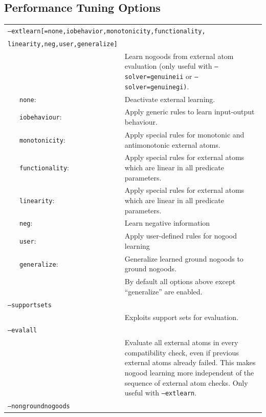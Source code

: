 \documentclass[a4paper, titlepage]{article}
\begin{document}
\subsection{Performance Tuning Options}
\begin{center}
\begin{longtable}{p{0.7cm}  p{2.2cm} p{0.3cm} p{6.3cm}  } 
\multicolumn{4}{p{6cm}}{\texttt{--extlearn[=none,iobehavior,monotonicity,functionality,}} \\
\multicolumn{3}{l}{\texttt{linearity,neg,user,generalize]}} \\
& & & Learn nogoods from external atom evaluation (only useful with \texttt{--solver=genuineii} or \texttt{--solver=genuinegi)}.\\
&\texttt{none}:& & Deactivate external learning. \\
&\texttt{iobehaviour}:& &Apply generic rules to learn input-output behaviour. \\
&\texttt{monotonicity}:& &Apply special rules for monotonic and antimonotonic external atoms.\\
&\texttt{functionality}:& &Apply special rules for external atoms which are linear in all predicate parameters.\\
&\texttt{linearity}:& &Apply special rules for external atoms which are linear in all predicate parameters.\\
&\texttt{neg}:& &Learn negative information\\
&\texttt{user}:& &Apply user-defined rules for nogood learning\\
&\texttt{generalize}:& &Generalize learned ground nogoods to ground nogoods.\\
& & & By default all options above except ``generalize'' are enabled.\\
\multicolumn{4}{l}{\texttt{--supportsets}}\\
& & &Exploits support sets for evaluation.\\
\multicolumn{4}{l}{\texttt{--evalall}}\\
& & &Evaluate all external atoms in every compatibility check, even if previous external atoms already failed.  This makes nogood learning more independent of the sequence of external atom checks. Only useful with \texttt{--extlearn}.\\
\multicolumn{4}{l}{\texttt{--nongroundnogoods}}\\

\end{longtable}
\end{center}
\end{document}

